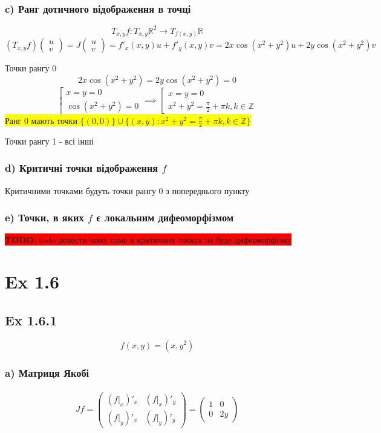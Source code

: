 \documentclass[10pt, a4paper]{article} %
\newcommand{\R}{\mathbb{R}}
\newcommand{\todo}[1]{\colorbox{red}{\textbf{TODO}: #1}}
\begin{document}
\subsubsection*{c) Ранг дотичного відображення в точці}
\[T_{x,y} f : T_{x,y}\R^2 \to T_{f(x,y)}\R\]
\[(T_{x,y} f) \begin{pmatrix} u \\ v \end{pmatrix}
= J\begin{pmatrix} u \\ v \end{pmatrix} = f'_x(x,y) u + f'_y(x,y) v = 2x\cos(x^2+y^2)u + 2y\cos(x^2+y^2)v\]

Точки рангу 0
\[2x\cos(x^2+y^2)=2y\cos(x^2+y^2)=0\]
\[\left[\begin{array}{l}
    x=y=0\\
    \cos(x^2+y^2) = 0
\end{array}\right. \implies \left[\begin{array}{l}
    x=y=0\\
    x^2+y^2 = \frac{\pi}{2}+\pi k, k \in \mathbb Z
\end{array}\right. \]
\colorbox{yellow}{Ранг 0 мають точки $\{(0,0)\} \cup \{(x,y) : x^2+y^2 = \frac{\pi}{2}+\pi k, k \in \mathbb Z\}$}

Точки рангу 1 - всі інші

\subsubsection*{d) Критичні точки відображення $f$}

Критичними точками будуть точки рангу 0 з попереднього пункту

\subsubsection*{e) Точки, в яких $f$ є локальним дифеоморфізмом}
\todo{todo довести чому саме в критичних точках не буде дифеоморфізму}

\section*{Ex 1.6}

\subsection*{Ex 1.6.1}
\[f(x,y) = (x,y^2)\]
\subsubsection*{a) Матриця Якобі}
\begin{align*}
    Jf = \begin{pmatrix}
        (f|_x)'_x & (f|_x)'_y\\
        (f|_y)'_x & (f|_y)'_y
    \end{pmatrix} 
    = \begin{pmatrix}
        1 & 0\\
        0 & 2y
    \end{pmatrix}
\end{align*}
\end{document}
